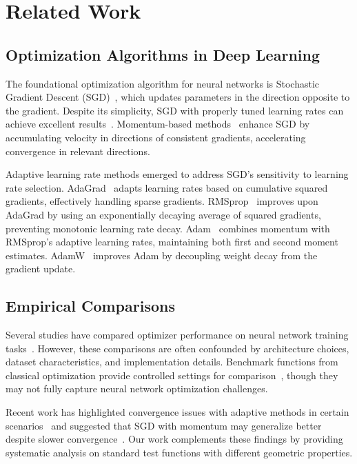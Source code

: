 \documentclass[12pt,a4paper]{article}
\begin{document}
\section{Related Work}
\label{sec:related}

\subsection{Optimization Algorithms in Deep Learning}

The foundational optimization algorithm for neural networks is Stochastic Gradient Descent (SGD)~\cite{robbins1951stochastic}, which updates parameters in the direction opposite to the gradient. Despite its simplicity, SGD with properly tuned learning rates can achieve excellent results~\cite{wilson2017marginal}. Momentum-based methods~\cite{polyak1964some,sutskever2013importance} enhance SGD by accumulating velocity in directions of consistent gradients, accelerating convergence in relevant directions.

Adaptive learning rate methods emerged to address SGD's sensitivity to learning rate selection. AdaGrad~\cite{duchi2011adaptive} adapts learning rates based on cumulative squared gradients, effectively handling sparse gradients. RMSprop~\cite{tieleman2012lecture} improves upon AdaGrad by using an exponentially decaying average of squared gradients, preventing monotonic learning rate decay. Adam~\cite{kingma2014adam} combines momentum with RMSprop's adaptive learning rates, maintaining both first and second moment estimates. AdamW~\cite{loshchilov2017decoupled} improves Adam by decoupling weight decay from the gradient update.

\subsection{Empirical Comparisons}

Several studies have compared optimizer performance on neural network training tasks~\cite{wilson2017marginal,schmidt2021descending}. However, these comparisons are often confounded by architecture choices, dataset characteristics, and implementation details. Benchmark functions from classical optimization provide controlled settings for comparison~\cite{jamil2013literature}, though they may not fully capture neural network optimization challenges.

Recent work has highlighted convergence issues with adaptive methods in certain scenarios~\cite{reddi2019convergence} and suggested that SGD with momentum may generalize better despite slower convergence~\cite{wilson2017marginal}. Our work complements these findings by providing systematic analysis on standard test functions with different geometric properties.
\end{document}
